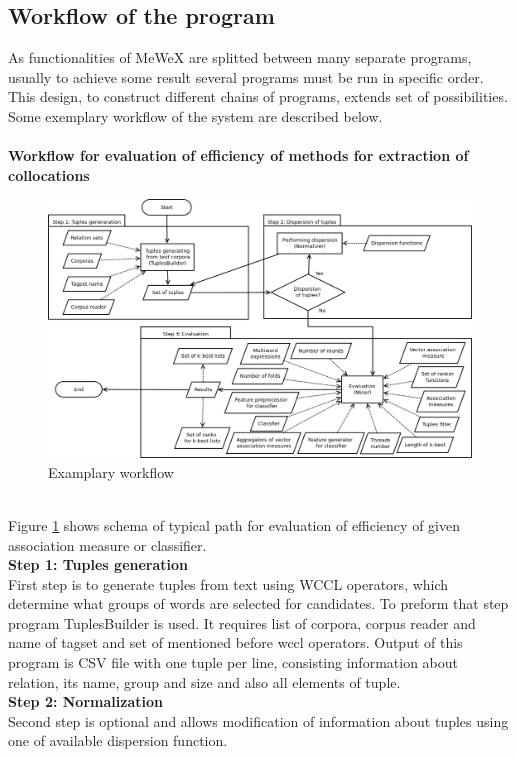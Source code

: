 \subsection{Workflow of the program} \label{mewex_workflow}
As functionalities of MeWeX are splitted between many separate programs, usually to achieve some result several programs must be run in specific order. 
This design, to construct different chains of programs, extends set of possibilities. Some exemplary workflow of the system are described below. 
\\ \\\textbf{Workflow for evaluation of efficiency of methods for extraction of collocations}
\begin{figure}[ht]
	\centering
	\includegraphics[scale=0.4]{img/mewex_workflow1.png}
	\caption{Examplary workflow}
	\label{img_workflow1}
\end{figure}
\\ Figure \ref{img_workflow1} shows schema of typical path for evaluation of efficiency of given association measure or classifier.
\\ \textbf{Step 1: Tuples generation}\\
First step is to generate tuples from text using WCCL operators, which determine what groups of words are selected for candidates. 
To preform that step program TuplesBuilder is used. It requires list of corpora, corpus reader and name of tagset and 
set of mentioned before wccl operators. Output of this program is CSV file with one tuple per line, consisting information about relation, 
its name, group and size and also all elements of tuple.
\\ \textbf{Step 2: Normalization}\\
Second step is optional and allows modification of information about tuples using one of available dispersion function. 
